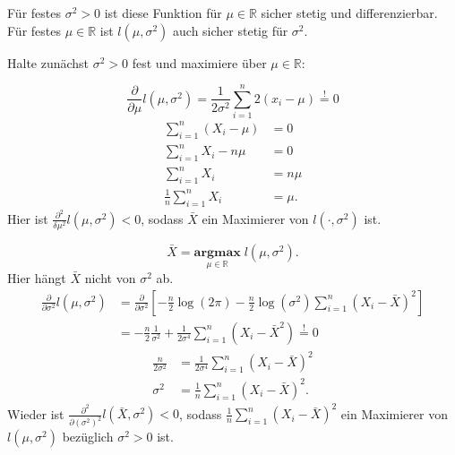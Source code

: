 \documentclass[10pt]{article}
\newcommand{\IR}{\mathbb{R}} %
\newenvironment{BSP}[1][]
{\begin{Beispiel}[frametitle=#1]}{\end{Beispiel}}
\begin{document}
\begin{BSP}[Beispiel 1.3.8 (Maximum-Likelihood)]
\begin{enumerate}[label = (\roman*)]
			Für festes $\sigma^2 >0$ ist diese Funktion für $\mu \in \IR$ sicher stetig und differenzierbar. Für festes $\mu \in \IR$ ist $l(\mu, \sigma^2)$ auch sicher stetig für $\sigma^2$. 
			
			Halte zunächst $\sigma^2 >0$ fest und maximiere über $\mu \in \IR$: 
			
			\begin{equation*}
				\frac{\partial}{\partial \mu} l(\mu, \sigma^2) = \frac{1}{2\sigma^2} \sum_{i=1}^{n}2(x_i-\mu) \overset{!}= 0
			\end{equation*}
			\begin{equation*}
				\begin{split}
					\sum_{i=1}^{n}(X_i - \mu) &= 0\\
					\sum_{i=1}^{n}X_i - n\mu &= 0\\
					\sum_{i=1}^{n}X_i &= n\mu \\
					\frac{1}{n}\sum_{i=1}^{n}X_i &= \mu.			
				\end{split}
			\end{equation*}
			Hier ist $\frac{\partial^2}{\delta\mu^2}l(\mu, \sigma^2) <0$, sodass $\bar{X}$ ein Maximierer von $l(\cdot,\sigma^2)$ ist. 
			
			\begin{equation*}
				\bar{X} = \underset{\mu \in \IR}{\textbf{argmax}}\; l(\mu, \sigma^2).
			\end{equation*}
			Hier hängt $\bar{X}$ nicht von $\sigma^2$ ab. 
			\begin{equation*}
				\begin{split}
				\frac{\partial}{\partial \sigma^2} l (\mu, \sigma^2) &= \frac{\partial}{\partial \sigma^2} \left[-\frac{n}{2}\log(2\pi)-\frac{n}{2}\log(\sigma^2)\sum_{i=1}^{n}(X_i - \bar{X})^2\right]\\ &= -\frac{n}{2} \frac{1}{\sigma^2}+ \frac{1}{2\sigma^4}\sum_{i=1}^{n}(X_i-\bar{X}^2) \overset{!} = 0
			\end{split}
			\end{equation*}
			\begin{equation*}
				\begin{split}
					\frac{n}{2\sigma^2} &= \frac{1}{2\sigma^4}\sum_{i=1}^{n}(X_i - \bar{X})^2\\
					\sigma^2 &= \frac{1}{n}\sum_{i=1}^{n}(X_i-\bar{X})^2.
				\end{split}
			\end{equation*}
			Wieder ist  $\frac{\partial^2}{\partial (\sigma^2)^2} l(\bar{X}, \sigma^2)<0$, sodass $\frac{1}{n}$$\sum_{i=1}^{n}(X_i-\bar{X})^2$ ein Maximierer von $l(\mu, \sigma^2)$ bezüglich $\sigma^2 > 0$ ist. 
			

\end{enumerate}
\end{BSP}
\end{document}
